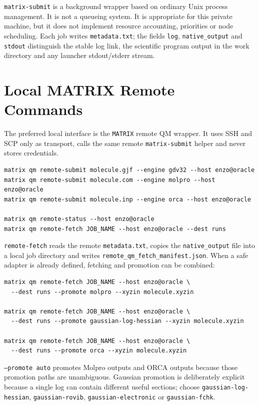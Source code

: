 \documentclass[11pt]{article}
\newcommand{\framework}{\texttt{MATRIX}}
\begin{document}
\texttt{matrix-submit} is a background wrapper based on ordinary Unix process
management.  It is not a queueing system.  It is appropriate for this private
machine, but it does not implement resource accounting, priorities or node
scheduling.  Each job writes \texttt{metadata.txt}; the fields
\texttt{log}, \texttt{native\_output} and \texttt{stdout} distinguish the
stable log link, the scientific program output in the work directory and any
launcher stdout/stderr stream.

\section{Local MATRIX Remote Commands}

The preferred local interface is the \framework{} remote QM wrapper.  It uses
SSH and SCP only as transport, calls the same remote
\texttt{matrix-submit} helper and never stores credentials.

\begin{lstlisting}[style=matrix]
matrix qm remote-submit molecule.gjf --engine gdv32 --host enzo@oracle
matrix qm remote-submit molecule.com --engine molpro --host enzo@oracle
matrix qm remote-submit molecule.inp --engine orca --host enzo@oracle

matrix qm remote-status --host enzo@oracle
matrix qm remote-fetch JOB_NAME --host enzo@oracle --dest runs
\end{lstlisting}

\texttt{remote-fetch} reads the remote \texttt{metadata.txt}, copies the
\texttt{native\_output} file into a local job directory and writes
\texttt{remote\_qm\_fetch\_manifest.json}.  When a safe adapter is already
defined, fetching and promotion can be combined:

\begin{lstlisting}[style=matrix]
matrix qm remote-fetch JOB_NAME --host enzo@oracle \
  --dest runs --promote molpro --xyzin molecule.xyzin

matrix qm remote-fetch JOB_NAME --host enzo@oracle \
  --dest runs --promote gaussian-log-hessian --xyzin molecule.xyzin

matrix qm remote-fetch JOB_NAME --host enzo@oracle \
  --dest runs --promote orca --xyzin molecule.xyzin
\end{lstlisting}

\texttt{--promote auto} promotes Molpro outputs and ORCA outputs because those
promotion paths are unambiguous.  Gaussian promotion is deliberately explicit
because a single log can contain different useful sections; choose
\texttt{gaussian-log-hessian}, \texttt{gaussian-rovib},
\texttt{gaussian-electronic} or \texttt{gaussian-fchk}.
\end{document}
